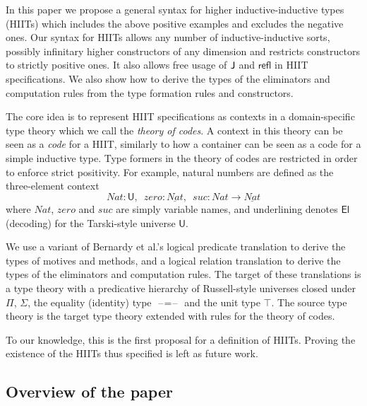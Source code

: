 \documentclass[a4paper,UKenglish]{lipics-v2018}
\newcommand{\U}{\mathsf{U}}
\newcommand{\El}{\mathsf{El}}
\newcommand{\ra}{\rightarrow}
\newcommand{\blank}{\mathord{\hspace{1pt}\text{--}\hspace{1pt}}} %
\newcommand{\refl}{\mathsf{refl}}
\newcommand{\1}{\mathsf{1}} \renewcommand{\Pr}{\mathsf{Pr}}
\begin{document}
In this paper we propose a general syntax for higher
inductive-inductive types (HIITs) which includes the above positive
examples and excludes the negative ones. Our syntax for HIITs allows
any number of inductive-inductive sorts, possibly infinitary higher
constructors of any dimension and restricts constructors to strictly
positive ones. It also allows free usage of $\mathsf{J}$ and $\refl$ in HIIT
specifications.  We also show how to derive the types of the
eliminators and computation rules from the type formation rules and
constructors.

The core idea is to represent HIIT specifications as contexts in a
domain-specific type theory which we call the \emph{theory of
  codes}. A context in this theory can be seen as a \emph{code} for a
HIIT, similarly to how a container \cite{abbot05containers} can be
seen as a code for a simple inductive type. Type formers in the theory
of codes are restricted in order to enforce strict positivity. For
example, natural numbers are defined as the three-element context
\[
  Nat:\U,\,\,\, zero:\underline{Nat},\,\,\, suc : Nat \ra \underline{Nat}
\]
where $Nat$, $zero$ and $suc$ are simply variable names, and underlining
denotes $\El$ (decoding) for the Tarski-style universe $\U$.

We use a variant of Bernardy et al.'s logical predicate translation
\cite{bernardy2010parametricity} to derive the types of motives and
methods, and a logical relation translation to derive the types of the
eliminators and computation rules. The target of these translations is
a type theory with a predicative hierarchy of Russell-style universes
closed under $\Pi$, $\Sigma$, the equality (identity) type
$\blank=\blank$ and the unit type $\top$. The source type theory is
the target type theory extended with rules for the theory of codes.

To our knowledge, this is the first proposal for a definition of
HIITs. Proving the existence of the HIITs thus specified is left as
future work.

\subsection{Overview of the paper}
\end{document}

